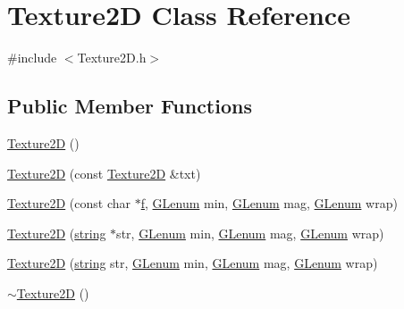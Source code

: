 \hypertarget{class_texture2_d}{\section{Texture2\-D Class Reference}
\label{class_texture2_d}
}


{\ttfamily \#include $<$Texture2\-D.\-h$>$}

\subsection*{Public Member Functions}
\begin{DoxyCompactItemize}
\item 
\hyperlink{class_texture2_d_ab62c7c5172a4800b4629cd475147819d}{Texture2\-D} ()
\item 
\hyperlink{class_texture2_d_a0e28917acb76809ce4c367b53f8432b4}{Texture2\-D} (const \hyperlink{class_texture2_d}{Texture2\-D} \&txt)
\item 
\hyperlink{class_texture2_d_a1d7c615801655eba7fbdcfe9d2b2c2f9}{Texture2\-D} (const char $\ast$\hyperlink{_g_l_e_w_2glew_8h_aba8ad56949f59242bc167b073dae3715}{f}, \hyperlink{_g_l_e_w_2glew_8h_a5d5233918a454ad3975c620a69ac5f0b}{G\-Lenum} min, \hyperlink{_g_l_e_w_2glew_8h_a5d5233918a454ad3975c620a69ac5f0b}{G\-Lenum} mag, \hyperlink{_g_l_e_w_2glew_8h_a5d5233918a454ad3975c620a69ac5f0b}{G\-Lenum} wrap)
\item 
\hyperlink{class_texture2_d_af9472182b2aa2a3b00862e72cbf08c87}{Texture2\-D} (\hyperlink{_g_l_e_w_2glew_8h_a06b88fc81ad0b30d1512e9609e3d7c82}{string} $\ast$str, \hyperlink{_g_l_e_w_2glew_8h_a5d5233918a454ad3975c620a69ac5f0b}{G\-Lenum} min, \hyperlink{_g_l_e_w_2glew_8h_a5d5233918a454ad3975c620a69ac5f0b}{G\-Lenum} mag, \hyperlink{_g_l_e_w_2glew_8h_a5d5233918a454ad3975c620a69ac5f0b}{G\-Lenum} wrap)
\item 
\hyperlink{class_texture2_d_a1a9aa1557b06ce741edbd0eb2bdc337f}{Texture2\-D} (\hyperlink{_g_l_e_w_2glew_8h_a06b88fc81ad0b30d1512e9609e3d7c82}{string} str, \hyperlink{_g_l_e_w_2glew_8h_a5d5233918a454ad3975c620a69ac5f0b}{G\-Lenum} min, \hyperlink{_g_l_e_w_2glew_8h_a5d5233918a454ad3975c620a69ac5f0b}{G\-Lenum} mag, \hyperlink{_g_l_e_w_2glew_8h_a5d5233918a454ad3975c620a69ac5f0b}{G\-Lenum} wrap)
\item 
\hyperlink{class_texture2_d_a84210f27b55799a096b8abc36380a077}{$\sim$\-Texture2\-D} ()
\end{DoxyCompactItemize}

